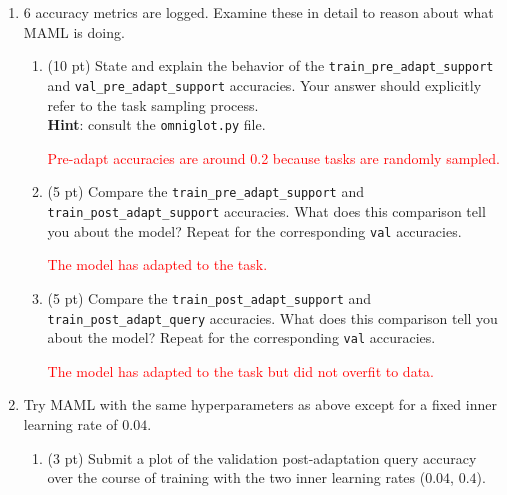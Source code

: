 \documentclass[12pt]{article}
\begin{document}
\begin{enumerate}
\begin{enumerate}
    \end{enumerate}
    
    \newpage
    \item 6 accuracy metrics are logged. Examine these in detail to reason about what MAML is doing.
    \begin{enumerate}[label=(\alph*)]
        \item (10 pt) State and explain the behavior of the \texttt{train\_pre\_adapt\_support} and \texttt{val\_pre\_adapt\_support} accuracies. Your answer should explicitly refer to the task sampling process. \\ \textbf{Hint}: consult the \texttt{omniglot.py} file.

        \textcolor{red}{Pre-adapt accuracies are around 0.2 because tasks are randomly sampled.}

    
        \item (5 pt) Compare the \texttt{train\_pre\_adapt\_support} and \texttt{train\_post\_adapt\_support} accuracies. What does this comparison tell you about the model? Repeat for the corresponding \texttt{val} accuracies.

        \textcolor{red}{The model has adapted to the task.}
        
        \item (5 pt) Compare the \texttt{train\_post\_adapt\_support} and \texttt{train\_post\_adapt\_query} accuracies. What does this comparison tell you about the model? Repeat for the corresponding \texttt{val} accuracies.
        
        \textcolor{red}{The model has adapted to the task but did not overfit to data.}

    \end{enumerate}

    \newpage
    \item Try MAML with the same hyperparameters as above except for a fixed inner learning rate of $0.04$.
    \begin{enumerate}[label=(\alph*)]
        \item (3 pt) Submit a plot of the validation post-adaptation query accuracy over the course of training with the two inner learning rates ($0.04$, $0.4$).
        

\end{enumerate}
\end{enumerate}
\end{document}
